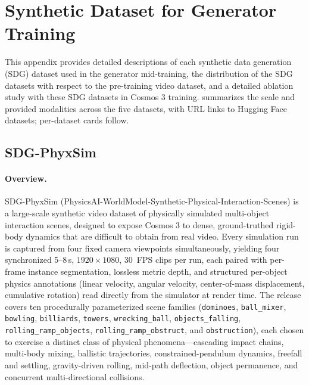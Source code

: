 \section{Synthetic Dataset for Generator Training}
\label{appendix:sdg_datasets}

This appendix provides detailed descriptions of each synthetic data generation (SDG) dataset used in the generator mid-training, the distribution of the SDG datasets with respect to the pre-training video dataset, and a detailed ablation study with these SDG datasets in Cosmos 3 training.  summarizes the scale and provided modalities across the five datasets, with URL links to Hugging Face datasets; per-dataset cards follow.



\subsection{SDG-PhyxSim}
\label{appendix:sdg_phyxsim}



\paragraph{Overview.}
\label{appendix:sdg_phyxsim_overview}
SDG-PhyxSim (PhysicsAI-WorldModel-Synthetic-Physical-Interaction-Scenes) is a large-scale synthetic video dataset of physically simulated
multi-object interaction scenes, designed to expose Cosmos 3 to dense,
ground-truthed rigid-body dynamics that are difficult to obtain from real
video. Every simulation run is captured from four fixed camera viewpoints
simultaneously, yielding four synchronized 5--8\,s, $1920{\times}1080$,
30\, FPS clips per run, each paired with per-frame instance segmentation,
lossless metric depth, and structured per-object physics annotations
(linear velocity, angular velocity, center-of-mass displacement, cumulative
rotation) read directly from the simulator at render time. The release
covers ten procedurally parameterized scene families
(\texttt{dominoes}, \texttt{ball\_mixer}, \texttt{bowling}, \texttt{billiards},
\texttt{towers}, \texttt{wrecking\_ball}, \texttt{objects\_falling},
\texttt{rolling\_ramp\_objects}, \texttt{rolling\_ramp\_obstruct}, and
\texttt{obstruction}), each chosen to exercise a distinct class of physical
phenomena---cascading impact chains, multi-body mixing, ballistic
trajectories, constrained-pendulum dynamics, freefall and settling,
gravity-driven rolling, mid-path deflection, object permanence, and
concurrent multi-directional collisions.

